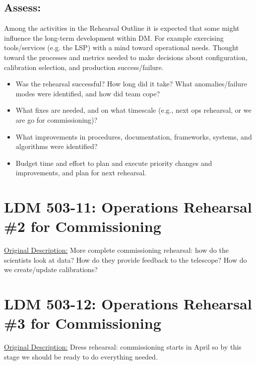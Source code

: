 \subsection{Assess:}

Among the activities in the Rehearsal Outline it is expected that some might influence the long-term development
within DM.  For example exercising tools/services (e.g. the LSP) with a mind toward operational needs.  Thought
toward the processes and metrics needed to make decisions about configuration, calibration selection, 
and production success/failure. 

\begin{itemize}
\item Was the rehearsal successful? How long did it take? What anomalies/failure modes were identified, and how did team cope? 
\item What fixes are needed, and on what timescale (e.g., next ops rehearsal, or we are go for commissioning)? 
\item What improvements in procedures, documentation, frameworks, systems, and algorithms were identified?
\item Budget time and effort to plan and execute priority changes and improvements, and plan for next rehearsal.
\end{itemize}


%
%
%

\section{LDM 503-11: Operations Rehearsal \#2 for Commissioning}

\underline{Original Description:}
More complete commissioning rehearsal: how do the scientists look at data? 
How do they provide feedback to the telescope? How do we create/update 
calibrations?

%
%
%

\section{LDM 503-12: Operations Rehearsal \#3 for Commissioning}

\underline{Original Description:}
Dress rehearsal: commissioning starts in April so by this stage we should 
be ready to do everything needed.


